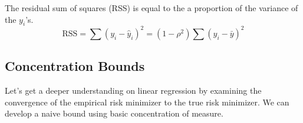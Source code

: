   \begin{theorem}
    The residual sum of squares (RSS) is equal to the a proportion of the variance of the $y_i$'s. 
    \begin{equation}
      \mathrm{RSS} = \sum (y_i - \hat{y}_i)^2 = (1 - \rho^2) \sum (y_i - \bar{y})^2 
    \end{equation}
  \end{theorem}

\subsection{Concentration Bounds} 

  Let's get a deeper understanding on linear regression by examining the convergence of the empirical risk minimizer to the true risk minimizer. We can develop a naive bound using basic concentration of measure. 

